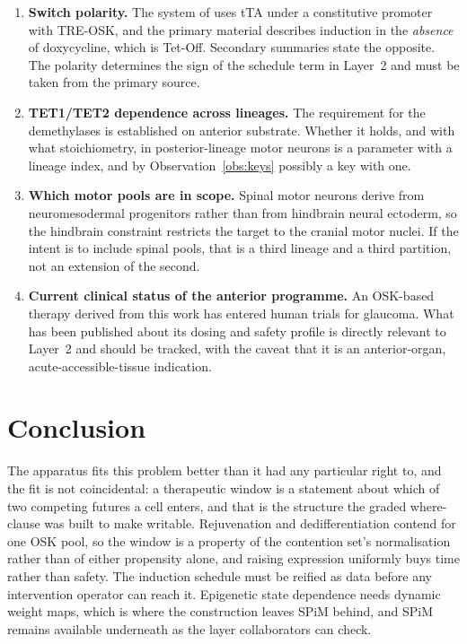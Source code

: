 \documentclass[11pt,a4paper]{article}
\theoremstyle{plain}
\theoremstyle{definition}
\theoremstyle{remark}
\begin{document}
\begin{enumerate}[leftmargin=1.6em,itemsep=3pt]
\item \textbf{Switch polarity.} The system of \cite{LuEtAl} uses tTA under a
constitutive promoter with TRE-OSK, and the primary material describes
induction in the \emph{absence} of doxycycline, which is Tet-Off. Secondary
summaries state the opposite. The polarity determines the sign of the
schedule term in Layer~2 and must be taken from the primary source.
\item \textbf{TET1/TET2 dependence across lineages.} The requirement for the
demethylases is established on anterior substrate. Whether it holds, and with
what stoichiometry, in posterior-lineage motor neurons is a parameter with a
lineage index, and by Observation~\ref{obs:keys} possibly a key with one.
\item \textbf{Which motor pools are in scope.} Spinal motor neurons derive
from neuromesodermal progenitors rather than from hindbrain neural ectoderm,
so the hindbrain constraint restricts the target to the cranial motor nuclei.
If the intent is to include spinal pools, that is a third lineage and a third
partition, not an extension of the second.
\item \textbf{Current clinical status of the anterior programme.} An
OSK-based therapy derived from this work has entered human trials for
glaucoma. What has been published about its dosing and safety profile is
directly relevant to Layer~2 and should be tracked, with the caveat that it is
an anterior-organ, acute-accessible-tissue indication.
\end{enumerate}

\section{Conclusion}\label{sec:conc}

The apparatus fits this problem better than it had any particular right to,
and the fit is not coincidental: a therapeutic window is a statement about
which of two competing futures a cell enters, and that is the structure the
graded where-clause was built to make writable. Rejuvenation and
dedifferentiation contend for one OSK pool, so the window is a property of the
contention set's normalisation rather than of either propensity alone, and
raising expression uniformly buys time rather than safety. The induction
schedule must be reified as data before any intervention operator can reach
it. Epigenetic state dependence needs dynamic weight maps, which is where the
construction leaves SPiM behind, and SPiM remains available underneath as the
layer collaborators can check.
\end{document}
